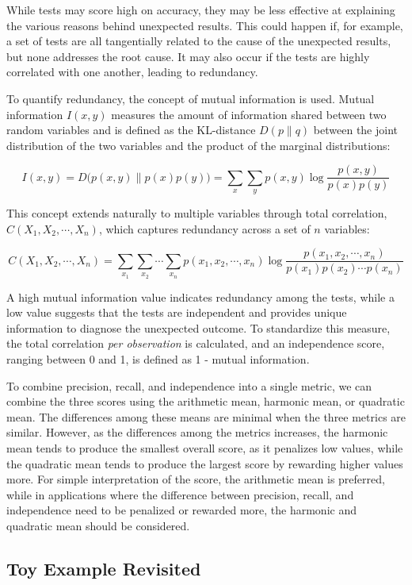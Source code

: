 \documentclass[
  12pt,
]{interact}
\begin{document}
While tests may score high on accuracy, they may be less effective at
explaining the various reasons behind unexpected results. This could
happen if, for example, a set of tests are all tangentially related to
the cause of the unexpected results, but none addresses the root cause.
It may also occur if the tests are highly correlated with one another,
leading to redundancy.

To quantify redundancy, the concept of mutual information is used.
Mutual information \(I(x, y)\) measures the amount of information shared
between two random variables and is defined as the KL-distance
\(D(p \parallel q)\) between the joint distribution of the two variables
and the product of the marginal distributions:

\[I(x,y) = D\big(p(x,y) \parallel p(x)p(y)\big) = \sum_x \sum_y p(x,y) \log \frac{p(x,y)}{p(x)p(y)}\]

This concept extends naturally to multiple variables through total
correlation, \(C(X_1, X_2, \cdots, X_n)\), which captures redundancy
across a set of \(n\) variables:

\[C(X_1, X_2, \cdots, X_n) = \sum_{x_1} \sum_{x_2} \cdots \sum_{x_n} p(x_1, x_2, \cdots, x_n) \log \frac{p(x_1, x_2, \cdots, x_n)}{p(x_1)p(x_2) \cdots p(x_n)}\]

A high mutual information value indicates redundancy among the tests,
while a low value suggests that the tests are independent and provides
unique information to diagnose the unexpected outcome. To standardize
this measure, the total correlation \emph{per observation} is
calculated, and an independence score, ranging between 0 and 1, is
defined as 1 - mutual information.

To combine precision, recall, and independence into a single metric, we
can combine the three scores using the arithmetic mean, harmonic mean,
or quadratic mean. The differences among these means are minimal when
the three metrics are similar. However, as the differences among the
metrics increases, the harmonic mean tends to produce the smallest
overall score, as it penalizes low values, while the quadratic mean
tends to produce the largest score by rewarding higher values more. For
simple interpretation of the score, the arithmetic mean is preferred,
while in applications where the difference between precision, recall,
and independence need to be penalized or rewarded more, the harmonic and
quadratic mean should be considered.

\subsection{Toy Example Revisited}\label{toy-example-revisited}
\end{document}
